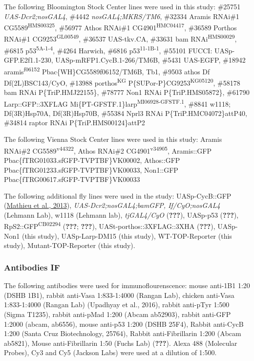 \documentclass[12pt,oneside]{reedthesis}
\begin{document}
The following Bloomington Stock Center lines were used in this study: \#25751 \emph{UAS-Dcr2;nosGAL4}, \#4442 \emph{nosGAL4;MKRS/TM6}, \#32334 Aramis RNAi\#1 CG5589\textsuperscript{HMS00325}, \#56977 Athos RNAi\#1 CG4901\textsuperscript{HMC04417}, \#36589 Porthos RNAi\#1 CG9253\textsuperscript{GL00549}, \#36537 UAS-tkv.CA, \#33631 bam RNAi\textsuperscript{HMS00029}, \#6815 p53\textsuperscript{5A-1-4}, \#4264 Harwich, \#6816 p53\textsuperscript{11-1B-1}, \#55101 FUCCI: UASp-GFP.E2f1.1-230, UASp-mRFP1.CycB.1-266/TM6B, \#5431 UAS-EGFP, \#18942 aramis\textsuperscript{f06152} Pbac\{WH\}CG5589f06152/TM6B, Tb1, \#9503 athos Df Df(2L)BSC143/CyO, \#13988 porthos\textsuperscript{KG} P\{SUPor-P\}CG9253\textsuperscript{KG05120}, \#58178 bam RNAi P\{TriP.HMJ22155\}, \#78777 Non1 RNAi P\{TriP.HMS05872\}, \#61790 Larp::GFP::3XFLAG Mi\{PT-GFSTF.1\}larp\textsuperscript{MI06928-GFSTF.1}, \#8841 w1118; Df(3R)Hsp70A, Df(3R)Hsp70B, \#55384 Nprl3 RNAi P\{TriP.HMC04072\}attP40, \#34814 raptor RNAi P\{TriP.HMS00124\}attP2

The following Vienna Stock Center lines were used in this study: Aramis RNAi\#2 CG5589\textsuperscript{v44322}, Athos RNAi\#2 CG4901\textsuperscript{v34905}, Aramis::GFP Pbac\{fTRG01033.sfGFP-TVPTBF\}VK00002, Athos::GFP Pbac\{fTRG01233.sfGFP-TVPTBF\}VK00033, Non1::GFP Pbac\{fTRG00617.sfGFP-TVPTBF\}VK00033

The following additional fly lines were used in the study: UASp-CycB::GFP (\href{https://www.ncbi.nlm.nih.gov/pmc/articles/PMC5830152/\#R25}{Mathieu et al., 2013}), \emph{UAS-Dcr2;nosGAL4;bamGFP, If/CyO;nosGAL4} (Lehmann Lab), w1118 (Lehmann lab), \emph{tjGAL4/CyO} ({\textbf{???}}), UASp-p53 ({\textbf{???}}), RpS2::GFP\textsuperscript{CB02294} ({\textbf{???}}; {\textbf{???}}), UASt-porthos::3XFLAG::3XHA ({\textbf{???}}), UASp-Non1 (this study), UASp-Larp-DM15 (this study), WT-TOP-Reporter (this study), Mutant-TOP-Reporter (this study).

\hypertarget{antibodies-if}{%
\subsubsection{Antibodies IF}\label{antibodies-if}}

The following antibodies were used for immunoflourenscence: mouse anti-1B1 1:20 (DSHB 1B1), rabbit anti-Vasa 1:833-1:4000 (Rangan Lab), chicken anti-Vasa 1:833-1:4000 (Rangan Lab) (Upadhyay et al., 2016), rabbit anti-pTyr 1:500 (Sigma T1235), rabbit anti-pMad 1:200 (Abcam ab52903), rabbit anti-GFP 1:2000 (abcam, ab6556), mouse anti-p53 1:200 (DSHB 25F4), Rabbit anti-CycB 1:200 (Santa Cruz Biotechnology, 25764), Rabbit anti-Fibrillarin 1:200 (Abcam ab5821), Mouse anti-Fibrillarin 1:50 (Fuchs Lab) ({\textbf{???}}). Alexa 488 (Molecular Probes), Cy3 and Cy5 (Jackson Labs) were used at a dilution of 1:500.
\end{document}
